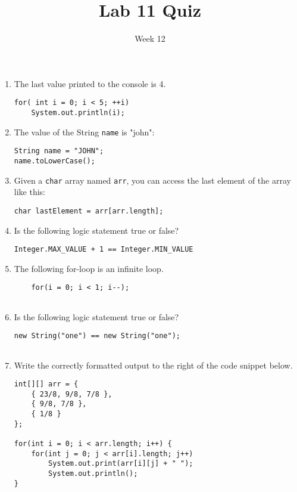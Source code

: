\documentclass[12pt]{article}
\title{Lab 11 Quiz}
\date{Week 12}
\begin{document}
 

\Instructions

\begin{enumerate}

\item {} \tf
The last value printed to the console is 4.
\begin{lstlisting}
for( int i = 0; i < 5; ++i)
    System.out.println(i);
\end{lstlisting}

 \item {} \tf
The value of the String \texttt{name} is "john":
\begin{lstlisting}
String name = "JOHN";
name.toLowerCase();
\end{lstlisting}

\item {} \tf Given a \texttt{char} array named \texttt{arr}, you can access the last element of the array like this:
\begin{lstlisting}
char lastElement = arr[arr.length];
\end{lstlisting}

\item {} \tf Is the following logic statement true or false?
\begin{lstlisting}
Integer.MAX_VALUE + 1 == Integer.MIN_VALUE

\end{lstlisting}

\item {} \tf The following for-loop is an infinite loop.

\begin{lstlisting}
	for(i = 0; i < 1; i--);
	
\end{lstlisting}


\item {} \tf Is the following logic statement true or false?
\begin{lstlisting}
new String("one") == new String("one");


\end{lstlisting}
\item {} Write the correctly formatted output to the right of the code snippet below.
\begin{lstlisting}
int[][] arr = {
	{ 23/8, 9/8, 7/8 },
	{ 9/8, 7/8 },
	{ 1/8 }
};

for(int i = 0; i < arr.length; i++) {
	for(int j = 0; j < arr[i].length; j++)
		System.out.print(arr[i][j] + " ");
    	System.out.println();
}
\end{lstlisting}


\clearpage
\ifdraft \clearpage \fi

\end{enumerate}   
\end{document}
